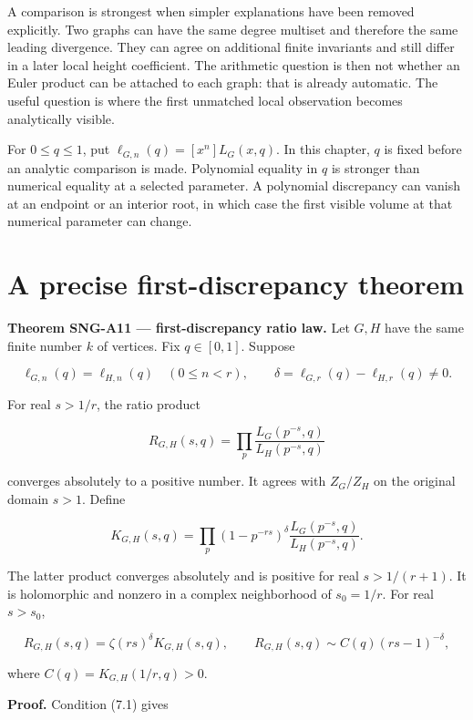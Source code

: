 \documentclass[
  11pt,
  a4paper,
]{report}
\begin{document}
A comparison is strongest when simpler explanations have been removed
explicitly. Two graphs can have the same degree multiset and therefore
the same leading divergence. They can agree on additional finite
invariants and still differ in a later local height coefficient. The
arithmetic question is then not whether an Euler product can be attached
to each graph: that is already automatic. The useful question is where
the first unmatched local observation becomes analytically visible.

For \(0\le q\le1\), put \(\ell_{G,n}(q)=[x^n]L_G(x,q)\). In this
chapter, \(q\) is fixed before an analytic comparison is made.
Polynomial equality in \(q\) is stronger than numerical equality at a
selected parameter. A polynomial discrepancy can vanish at an endpoint
or an interior root, in which case the first visible volume at that
numerical parameter can change.

\hypertarget{a-precise-first-discrepancy-theorem}{%
\section{A precise first-discrepancy
theorem}\label{a-precise-first-discrepancy-theorem}}

\textbf{Theorem SNG-A11 --- first-discrepancy ratio law.} Let \(G,H\)
have the same finite number \(k\) of vertices. Fix \(q\in[0,1]\).
Suppose

\[
 \ell_{G,n}(q)=\ell_{H,n}(q)\quad(0\le n<r),
 \qquad
 \delta=\ell_{G,r}(q)-\ell_{H,r}(q)\ne0.
 \tag{7.1}
\]

For real \(s>1/r\), the ratio product

\[
 R_{G,H}(s,q)=\prod_p
 \frac{L_G(p^{-s},q)}{L_H(p^{-s},q)}
 \tag{7.2}
\]

converges absolutely to a positive number. It agrees with \(Z_G/Z_H\) on
the original domain \(s>1\). Define

\[
 K_{G,H}(s,q)=\prod_p
 (1-p^{-rs})^\delta
 \frac{L_G(p^{-s},q)}{L_H(p^{-s},q)}.
 \tag{7.3}
\]

The latter product converges absolutely and is positive for real
\(s>1/(r+1)\). It is holomorphic and nonzero in a complex neighborhood
of \(s_0=1/r\). For real \(s>s_0\),

\[
 R_{G,H}(s,q)=\zeta(rs)^\delta K_{G,H}(s,q),
 \qquad
 R_{G,H}(s,q)\sim
 C(q)(rs-1)^{-\delta},
 \tag{7.4}
\]

where \(C(q)=K_{G,H}(1/r,q)>0\).

\textbf{Proof.} Condition (7.1) gives
\end{document}
